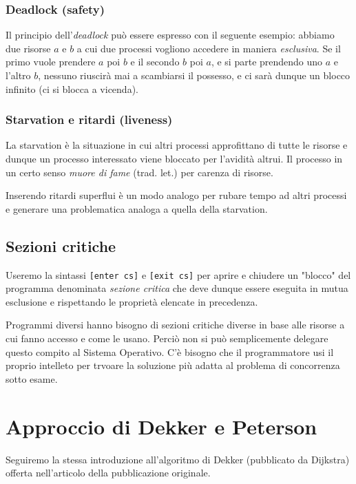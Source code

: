 \documentclass{article}
\begin{document}
\subsubsection{Deadlock (safety)}

Il principio dell'\emph{deadlock} pu\`o essere espresso con il seguente esempio:
abbiamo due risorse $a$ e $b$ a cui due processi vogliono accedere in maniera
\emph{esclusiva}. Se il primo vuole prendere $a$ poi $b$ e il secondo $b$ poi $a$,
e si parte prendendo uno $a$ e l'altro $b$, nessuno riuscir\`a mai a scambiarsi
il possesso, e ci sar\`a dunque un blocco infinito (ci si blocca a vicenda).

\subsubsection{Starvation e ritardi (liveness)}

La starvation \`e la situazione in cui altri processi approfittano di tutte le
risorse e dunque un processo interessato viene bloccato per l'avidit\`a altrui.
Il processo in un certo senso \emph{muore di fame} (trad. let.) per carenza di risorse.

Inserendo ritardi superflui \`e un modo analogo per rubare tempo ad altri
processi e generare una problematica analoga a quella della starvation.

\subsection{Sezioni critiche}

Useremo la sintassi \verb![enter cs]! e \verb![exit cs]! per aprire e chiudere
un "blocco" del programma denominata \emph{sezione critica} che deve dunque
essere eseguita in mutua esclusione e rispettando le propriet\`a elencate in
precedenza.

Programmi diversi hanno bisogno di sezioni critiche diverse in base alle risorse
a cui fanno accesso e come le usano. Perci\`o non si pu\`o semplicemente delegare
questo compito al Sistema Operativo. C'\`e bisogno che il programmatore usi il
proprio intelleto per trvoare la soluzione pi\`u adatta al problema di
concorrenza sotto esame.

\section{Approccio di Dekker e Peterson}

Seguiremo la stessa introduzione all'algoritmo di Dekker (pubblicato da Dijkstra)
offerta nell'articolo della pubblicazione originale.
\end{document}
